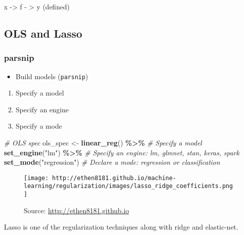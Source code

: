 \documentclass[
]{book}
\newenvironment{Shaded}{\begin{snugshade}}{\end{snugshade}}
\newcommand{\CommentTok}[1]{\textcolor[rgb]{0.56,0.35,0.01}{\textit{#1}}}
\newcommand{\KeywordTok}[1]{\textcolor[rgb]{0.13,0.29,0.53}{\textbf{#1}}}
\newcommand{\NormalTok}[1]{#1}
\newcommand{\OperatorTok}[1]{\textcolor[rgb]{0.81,0.36,0.00}{\textbf{#1}}}
\newcommand{\StringTok}[1]{\textcolor[rgb]{0.31,0.60,0.02}{#1}}
\providecommand{\tightlist}{%
  \setlength{\itemsep}{0pt}\setlength{\parskip}{0pt}}
\begin{document}
x -\textgreater{} f - \textgreater{} y (defined)

\hypertarget{ols-and-lasso}{%
\subsection{OLS and Lasso}\label{ols-and-lasso}}

\hypertarget{parsnip}{%
\subsubsection{parsnip}\label{parsnip}}

\begin{itemize}
\tightlist
\item
  Build models (\texttt{parsnip})
\end{itemize}

\begin{enumerate}
\def\labelenumi{\arabic{enumi}.}
\tightlist
\item
  Specify a model
\item
  Specify an engine
\item
  Specify a mode
\end{enumerate}

\begin{Shaded}
\begin{Highlighting}[]
\CommentTok{\# OLS spec}
\NormalTok{ols\_spec \textless{}{-}}\StringTok{ }\KeywordTok{linear\_reg}\NormalTok{() }\OperatorTok{\%\textgreater{}\%}\StringTok{ }\CommentTok{\# Specify a model}
\StringTok{  }\KeywordTok{set\_engine}\NormalTok{(}\StringTok{"lm"}\NormalTok{) }\OperatorTok{\%\textgreater{}\%}\StringTok{ }\CommentTok{\# Specify an engine: lm, glmnet, stan, keras, spark}
\StringTok{  }\KeywordTok{set\_mode}\NormalTok{(}\StringTok{"regression"}\NormalTok{) }\CommentTok{\# Declare a mode: regression or classification}
\end{Highlighting}
\end{Shaded}

\begin{figure}
\centering
\texttt{[image: http://ethen8181.github.io/machine-learning/regularization/images/lasso\_ridge\_coefficients.png]}
\caption{Source: \url{http://ethen8181.github.io}}
\end{figure}

Lasso is one of the regularization techniques along with ridge and elastic-net.
\end{document}
